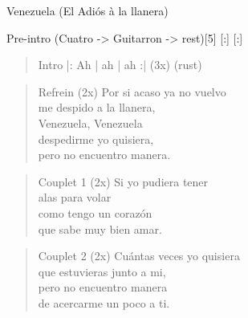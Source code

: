 \begin{song}[joropo]{Venezuela (El Adiós à la llanera)}
\begin{instrumental}{Pre-intro \textnormal{(Cuatro -> Guitarron -> rest)}}[5]
  [:]
   \measure{}  \measure{}    [:]
\end{instrumental}

\begin{verse}{Intro}
|:  \hspace{1em}Ah \hspace{2em} | ah \hspace{2em} | ah \hspace{2em} :| (3x) \hspace{1em}  \hspace{1em}(rust)
\end{verse}

\begin{verse}{Refrein (2x)}
\chord{-}Por si acaso ya no vuelvo\\
\chord{-}me despido a la llanera,\\
Venezuela, Venezuela\\
despedirme yo quisiera,\\
pero no encuentro manera. \hspace{1em} \\
\end{verse}

\begin{verse}{Couplet 1 (2x)}
Si yo pudiera tener\\
alas para volar\\
como tengo un corazón\\
que sabe muy bien amar.
\end{verse}

\begin{verse}{Couplet 2 (2x)}
Cu\'{a}ntas veces yo quisiera\\
que estuvieras junto a mi,\\
pero no encuentro manera\\
de acercarme un poco a ti.\hspace{2em}
\end{verse}


\end{song}

